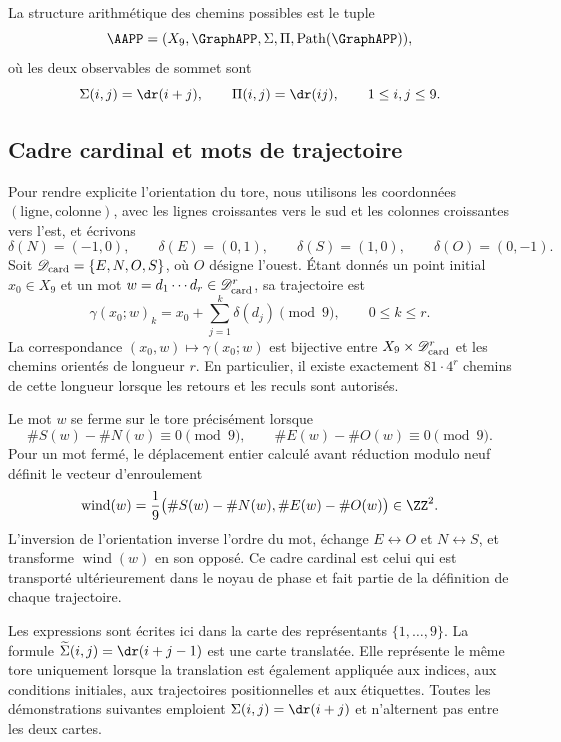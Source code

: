 \begin{definition}
La structure arithmétique des chemins possibles est le tuple
\[
 \AAPP=(X_9,\GraphAPP,\Sigma,\Pi,
        \operatorname{Path}(\GraphAPP)),
\]
où les deux observables de sommet sont
\[
\Sigma(i,j)=\dr(i+j),
\qquad
\Pi(i,j)=\dr(ij),
\qquad1\le i,j\le9.
\]
\end{definition}

\subsection*{Cadre cardinal et mots de trajectoire}

Pour rendre explicite l'orientation du tore, nous utilisons les coordonnées
\((\text{ligne},\text{colonne})\), avec les lignes croissantes vers le sud et les
colonnes croissantes vers l'est, et écrivons
\[
 \delta(N)=(-1,0),\qquad \delta(E)=(0,1),\qquad
 \delta(S)=(1,0),\qquad \delta(O)=(0,-1).
\]
Soit \(\mathscr D_{\rm card}=\{E,N,O,S\}\), où \(O\) désigne l'ouest. Étant donnés un point initial
\(x_0\in X_9\) et un mot \(w=d_1\cdots d_r\in
\mathscr D_{\rm card}^{r}\), sa trajectoire est
\[
 \gamma(x_0;w)_k
 =x_0+\sum_{j=1}^{k}\delta(d_j)\pmod 9,
 \qquad 0\leq k\leq r.
\]
La correspondance \((x_0,w)\mapsto\gamma(x_0;w)\) est bijective entre
\(X_9\times\mathscr D_{\rm card}^{r}\) et les chemins orientés de
longueur \(r\). En particulier, il existe exactement \(81\cdot4^r\) chemins
de cette longueur lorsque les retours et les reculs sont autorisés.

Le mot \(w\) se ferme sur le tore précisément lorsque
\[
\#S(w)-\#N(w)\equiv0\pmod9,
\qquad
\#E(w)-\#O(w)\equiv0\pmod9.
\]
Pour un mot fermé, le déplacement entier calculé avant réduction
modulo neuf définit le vecteur d'enroulement
\[
 \operatorname{wind}(w)=\frac1{9}
 \bigl(\#S(w)-\#N(w),\#E(w)-\#O(w)\bigr)\in\ZZ^2.
\]
L'inversion de l'orientation inverse l'ordre du mot, échange
\(E\leftrightarrow O\) et \(N\leftrightarrow S\), et transforme
\(\operatorname{wind}(w)\) en son opposé. Ce cadre cardinal est celui qui est
transporté ultérieurement dans le noyau de phase et fait partie de la définition
de chaque trajectoire.

Les expressions sont écrites ici dans la carte des représentants
\(\{1,\ldots,9\}\). La formule
\(\widetilde\Sigma(i,j)=\dr(i+j-1)\) est une carte translatée. Elle représente le
même tore uniquement lorsque la translation est également appliquée aux indices, aux conditions
initiales, aux trajectoires positionnelles et aux étiquettes. Toutes les démonstrations suivantes emploient
\(\Sigma(i,j)=\dr(i+j)\) et n'alternent pas entre les deux cartes.

